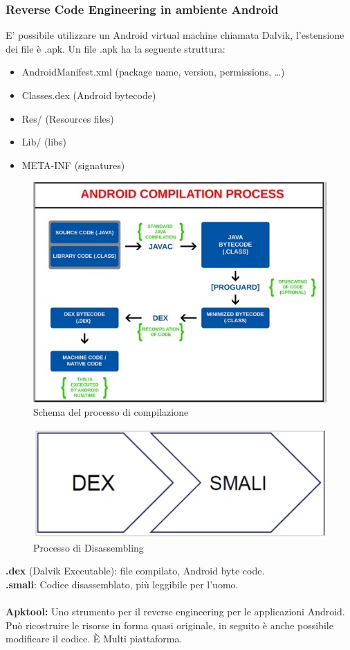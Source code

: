 \documentclass{article}
\begin{document}
\subsubsection{Reverse Code Engineering in ambiente Android}
E’ possibile utilizzare un Android virtual machine chiamata Dalvik, l’estensione dei file è .apk.
Un file .apk ha la seguente struttura:
\begin{itemize}
    \item AndroidManifest.xml (package name, version, permissions, \dots)
    \item Classes.dex (Android bytecode)
    \item Res/ (Resources files)
    \item Lib/ (libs)
    \item META-INF (signatures)
\end{itemize}
\begin{figure}[H]
    \center
    \includegraphics[scale=0.4]{images/RCE3.png}
    \caption{Schema del processo di compilazione}\label{fig:1}
\end{figure}
\begin{figure}[H]
    \center
    \includegraphics[scale=0.4]{images/RCE4.png}
    \caption{Processo di Disassembling}\label{fig:1}
\end{figure}
\noindent
\textbf{.dex} (Dalvik Executable): file compilato, Android byte code.\\
\textbf{.smali}: Codice disassemblato, più leggibile per l’uomo. \\\\
\textbf{Apktool:} Uno strumento per il reverse engineering per le applicazioni Android. Può ricostruire 
le risorse in forma quasi originale, in seguito è anche possibile modificare il codice. È Multi piattaforma.
\end{document}
